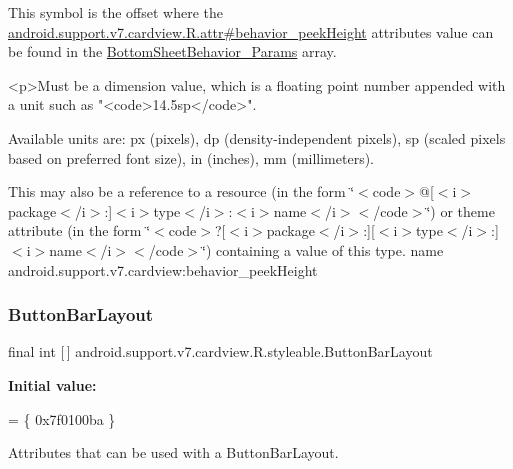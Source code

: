 This symbol is the offset where the \hyperlink{classandroid_1_1support_1_1v7_1_1cardview_1_1R_1_1attr_a31bb0e81ff71fbe4d22eecc92e1d48ce}{android.\+support.\+v7.\+cardview.\+R.\+attr\#behavior\+\_\+peek\+Height} attribute\textquotesingle{}s value can be found in the \hyperlink{classandroid_1_1support_1_1v7_1_1cardview_1_1R_1_1styleable_a2c7e34ab9878226fa3cb5d06e0b274a8}{Bottom\+Sheet\+Behavior\+\_\+\+Params} array.

\begin{DoxyVerb}      <p>Must be a dimension value, which is a floating point number appended with a unit such as "<code>14.5sp</code>".
\end{DoxyVerb}
 Available units are\+: px (pixels), dp (density-\/independent pixels), sp (scaled pixels based on preferred font size), in (inches), mm (millimeters). 

This may also be a reference to a resource (in the form \char`\"{}$<$code$>$@\mbox{[}$<$i$>$package$<$/i$>$\+:\mbox{]}$<$i$>$type$<$/i$>$\+:$<$i$>$name$<$/i$>$$<$/code$>$\char`\"{}) or theme attribute (in the form \char`\"{}$<$code$>$?\mbox{[}$<$i$>$package$<$/i$>$\+:\mbox{]}\mbox{[}$<$i$>$type$<$/i$>$\+:\mbox{]}$<$i$>$name$<$/i$>$$<$/code$>$\char`\"{}) containing a value of this type.  name android.\+support.\+v7.\+cardview\+:behavior\+\_\+peek\+Height \mbox{\label{classandroid_1_1support_1_1v7_1_1cardview_1_1R_1_1styleable_aaef402690ee9d9aa4bf6e3b5b46f95dd}} 
\subsubsection{\texorpdfstring{Button\+Bar\+Layout}{ButtonBarLayout}}
{\footnotesize\ttfamily final int \mbox{[}$\,$\mbox{]} android.\+support.\+v7.\+cardview.\+R.\+styleable.\+Button\+Bar\+Layout\hspace{0.3cm}{\ttfamily [static]}}

{\bfseries Initial value\+:}
\begin{DoxyCode}
= \{
            0x7f0100ba
        \}
\end{DoxyCode}
Attributes that can be used with a Button\+Bar\+Layout. 

